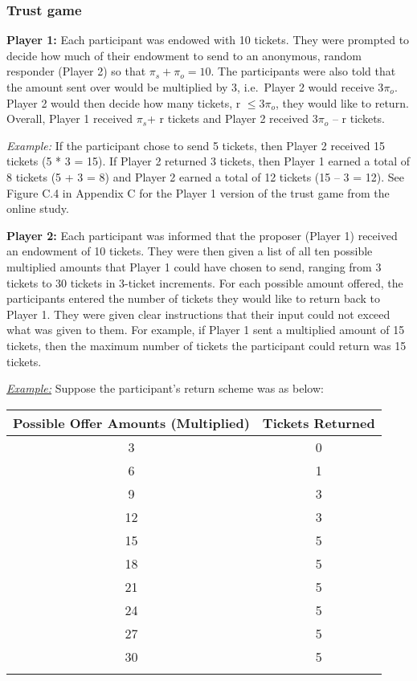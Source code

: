 \documentclass[12pt]{article}
\begin{document}
	
\subsubsection{Trust game}
\textbf{Player 1:} Each participant was endowed with 10 tickets. They were prompted to decide how much of their endowment to send to an anonymous, random responder (Player 2) so that \(\pi_{s} + \pi_{o} = 10\). The participants were also told that the amount sent over would be multiplied by 3, i.e.\ Player 2 would receive 3\(\pi_{o}\). Player 2 would then decide how many tickets, r \(\leq 3\pi_{o}\), they would like to return. Overall, Player 1 received \(\pi_{s}\)+ r tickets and Player 2 received 3\(\pi_{o}\) -- r tickets.

\textit{Example:} If the participant chose to send 5 tickets, then Player 2 received 15 tickets (5 * 3 = 15). If Player 2 returned 3 tickets, then Player 1 earned a total of 8 tickets (5 + 3 = 8) and Player 2 earned a total of 12 tickets (15 -- 3 = 12). See Figure C.4 in Appendix C for the Player 1 version of the trust game from the online study.

\textbf{Player 2:} Each participant was informed that the proposer (Player 1) received an endowment of 10 tickets. They were then given a list of all ten possible multiplied amounts that Player 1 could have chosen to send, ranging from 3 tickets to 30 tickets in 3-ticket increments. For each possible amount offered, the participants entered the number of tickets they would like to return back to Player 1. They were given clear instructions that their input could not exceed what was given to them. For example, if Player 1 sent a multiplied amount of 15 tickets, then the maximum number of tickets the participant could return was 15 tickets.

\underline{\textit{Example:}} Suppose the participant\rq s return scheme was as below: \\

\begin{center}
\begin{tabular}{ c c }
\hline \hline
 Possible Offer Amounts (Multiplied) & Tickets Returned \\ 
 \hline
3 & 0  \\  
6 & 1 \\  
9 & 3  \\  
12 & 3  \\  
15 & 5   \\  
18 & 5  \\  
21 & 5 \\  
24 & 5 \\  
27 & 5 \\  
30 & 5 \\  
\hline \hline \\
\end{tabular}
\end{center} 
\end{document}
